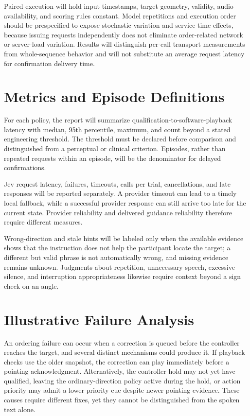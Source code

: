 Paired execution will hold input timestamps, target geometry, validity, audio availability, and scoring rules constant. Model repetitions and execution order should be prespecified to expose stochastic variation and service-time effects, because issuing requests independently does not eliminate order-related network or server-load variation. Results will distinguish per-call transport measurements from whole-sequence behavior and will not substitute an average request latency for confirmation delivery time.

\section{Metrics and Episode Definitions}
For each policy, the report will summarize qualification-to-software-playback latency with median, 95th percentile, maximum, and count beyond a stated engineering threshold. The threshold must be declared before comparison and distinguished from a perceptual or clinical criterion. Episodes, rather than repeated requests within an episode, will be the denominator for delayed confirmations.

Jev request latency, failures, timeouts, calls per trial, cancellations, and late responses will be reported separately. A provider timeout can lead to a timely local fallback, while a successful provider response can still arrive too late for the current state. Provider reliability and delivered guidance reliability therefore require different measures.

Wrong-direction and stale hints will be labeled only when the available evidence shows that the instruction does not help the participant locate the target; a different but valid phrase is not automatically wrong, and missing evidence remains unknown. Judgments about repetition, unnecessary speech, excessive silence, and interruption appropriateness likewise require context beyond a sign check on an angle.

\section{Illustrative Failure Analysis}
An ordering failure can occur when a correction is queued before the controller reaches the target, and several distinct mechanisms could produce it. If playback checks use the older snapshot, the correction can play immediately before a pointing acknowledgment. Alternatively, the controller hold may not yet have qualified, leaving the ordinary-direction policy active during the hold, or action priority may admit a lower-priority cue despite newer pointing evidence. These causes require different fixes, yet they cannot be distinguished from the spoken text alone.


